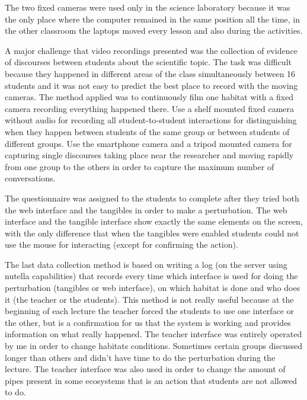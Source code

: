 The two fixed cameras were used only in the science laboratory because it was the only place where the computer remained in the same position all the time, in the other classroom the laptops moved every lesson and also during the activities. 

A major challenge that video recordings presented was the collection of evidence of discourses between students about the scientific topic. The task was difficult because they happened in different areas of the class simultaneously between 16 students and it was not easy to predict the best place to record with the moving cameras. The method applied was to continuously film one habitat with a fixed camera recording everything happened there. Use a shelf mounted fixed camera without audio for recording all student-to-student interactions for distinguishing when they happen between students of the same group or between students of different groups. Use the smartphone camera and a tripod mounted camera for capturing single discourses taking place near the researcher and moving rapidly from one group to the others in order to capture the maximum number of conversations.

The questionnaire was assigned to the students to complete after they tried both the web interface and the tangibles in order to make a perturbation. The web interface and the tangible interface show exactly the same elements on the screen, with the only difference that when the tangibles were enabled students could not use the mouse for interacting (except for confirming the action).

The last data collection method is based on writing a log (on the server using nutella capabilities) that records every time which interface is used for doing the perturbation (tangibles or web interface), on which habitat is done and who does it (the teacher or the students). This method is not really useful because at the beginning of each lecture the teacher forced the students to use one interface or the other, but is a confirmation for us that the system is working and provides information on what really happened. The teacher interface was entirely operated by me in order to change habitats conditions. Sometimes certain groups discussed longer than others and didn't have time to do the perturbation during the lecture. The teacher interface was also used in order to change the amount of pipes present in some ecosystems that is an action that students are not allowed to do.

